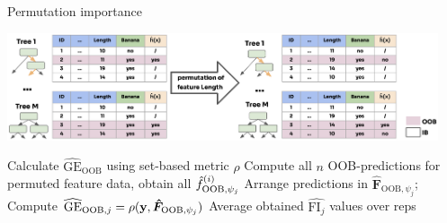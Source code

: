 \documentclass[11pt,compress,t,notes=noshow, xcolor=table]{beamer}
\begin{document}
\begin{vbframe}{Permutation importance}

\includegraphics[width = 0.95\textwidth]{figure_man/forest-permutation-imp.png}
\vspace{-1.2ex}
\begin{algorithm}[H]
\footnotesize
\begin{algorithmic}[1]
  \State Calculate $\widehat{\mathrm{GE}}_{\text{OOB}}$ using set-based metric $\rho$
	  \State Compute all $n$ OOB-predictions for permuted feature data, obtain all $\hat{f}^{(i)}_{\text{OOB},\psi_j}$
    \State Arrange predictions in $\bm{\hat{F}}_{\text{OOB},\psi_j}$;
    Compute $\widehat{\mathrm{GE}}_{\text{OOB}, j} = \rho(\mathbf{y}, \bm{\hat{F}}_{\text{OOB},\psi_j})$
  \EndFor
  \State Average obtained $\widehat{\text{FI}_j}$ values over reps
  \EndFor
\end{algorithmic}
\end{algorithm}
\vspace{-3ex}
\end{vbframe}
\end{document}
